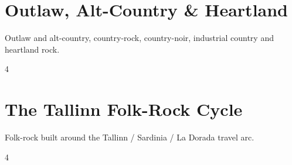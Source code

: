 \documentclass[a4paper,landscape]{memoir}
\begin{document}
\chapter{Outlaw, Alt-Country \& Heartland}
Outlaw and alt-country, country-rock, country-noir, industrial country and heartland rock.
\clearpage\begin{multicols*}{4}
\end{multicols*}

\chapter{The Tallinn Folk-Rock Cycle}
Folk-rock built around the Tallinn / Sardinia / La Dorada travel arc.
\clearpage\begin{multicols*}{4}
\end{multicols*}
\end{document}
